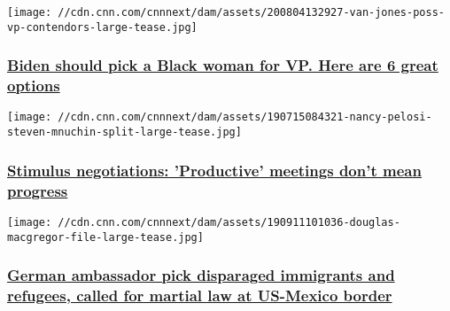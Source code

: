 \href{/2020/08/04/opinions/black-women-biden-vice-president-jones/index.html}{}

\texttt{[image: //cdn.cnn.com/cnnnext/dam/assets/200804132927-van-jones-poss-vp-contendors-large-tease.jpg]}

\hypertarget{biden-should-pick-a-black-woman-for-vp-here-are-6-great-options}{%
\subsubsection{\texorpdfstring{\href{/2020/08/04/opinions/black-women-biden-vice-president-jones/index.html}{Biden
should pick a Black woman for VP. Here are 6 great
options}}{Biden should pick a Black woman for VP. Here are 6 great options}}\label{biden-should-pick-a-black-woman-for-vp-here-are-6-great-options}}

\href{/2020/08/04/politics/congress-negotiations-state-of-play/index.html}{}

\texttt{[image: //cdn.cnn.com/cnnnext/dam/assets/190715084321-nancy-pelosi-steven-mnuchin-split-large-tease.jpg]}

\hypertarget{stimulus-negotiations-productive-meetings-dont-mean-progress-}{%
\subsubsection{\texorpdfstring{\href{/2020/08/04/politics/congress-negotiations-state-of-play/index.html}{Stimulus
negotiations: 'Productive' meetings don't mean progress
}}{Stimulus negotiations: 'Productive' meetings don't mean progress }}\label{stimulus-negotiations-productive-meetings-dont-mean-progress-}}

\href{/2020/08/04/politics/kfile-douglas-macgregor-german-ambassador-pick/index.html}{}

\texttt{[image: //cdn.cnn.com/cnnnext/dam/assets/190911101036-douglas-macgregor-file-large-tease.jpg]}

\hypertarget{german-ambassador-pick-disparaged-immigrants-and-refugees-called-for-martial-law-at-us-mexico-border}{%
\subsubsection{\texorpdfstring{\href{/2020/08/04/politics/kfile-douglas-macgregor-german-ambassador-pick/index.html}{German
ambassador pick disparaged immigrants and refugees, called for martial
law at US-Mexico
border}}{German ambassador pick disparaged immigrants and refugees, called for martial law at US-Mexico border}}\label{german-ambassador-pick-disparaged-immigrants-and-refugees-called-for-martial-law-at-us-mexico-border}}


